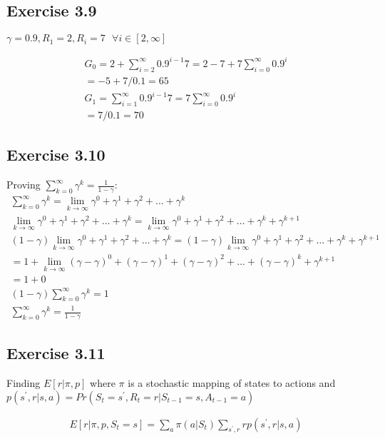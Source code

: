 \subsection{Exercise 3.9}
$\gamma = 0.9, R_1 = 2, R_i = 7 \text{ }\forall i \in [2,\infty]$

\begin{gather}
  G_0 = 2 + \sum_{i=2}^{\infty} 0.9^{i-1}7 = 2 - 7 + 7\sum_{i=0}^{\infty} 0.9^{i} \\
  = -5 + 7/0.1 = 65 \\
  G_1 = \sum_{i=1}^{\infty} 0.9^{i-1}7 = 7\sum_{i=0}^{\infty} 0.9^{i} \\
  = 7/0.1 = 70
\end{gather}

\subsection{Exercise 3.10}
Proving $\sum_{k=0}^{\infty}\gamma^k = \frac{1}{1-\gamma}$: 
\begin{gather}
  \sum_{k=0}^{\infty}\gamma^k = \lim_{k \to \infty}\gamma^0 + \gamma^1 + \gamma^2 + \dots + \gamma^k \\
  \lim_{k \to \infty}\gamma^0 + \gamma^1 + \gamma^2 + \dots + \gamma^k = \lim_{k \to \infty}\gamma^0 + \gamma^1 + \gamma^2 + \dots + \gamma^k + \gamma^{k+1} \\
  (1-\gamma)\lim_{k \to \infty}\gamma^0 + \gamma^1 + \gamma^2 + \dots + \gamma^k = (1-\gamma)\lim_{k \to \infty}\gamma^0 + \gamma^1 + \gamma^2 + \dots + \gamma^k + \gamma^{k+1} \\
  = 1+ \lim_{k \to \infty}(\gamma-\gamma)^0 + (\gamma-\gamma)^1 + (\gamma-\gamma)^2 + \dots + (\gamma-\gamma)^k + \gamma^{k+1} \\
  = 1 + 0 \\
  (1-\gamma)\sum_{k=0}^{\infty}\gamma^k = 1 \\
  \sum_{k=0}^{\infty}\gamma^k = \frac{1}{1-\gamma}
\end{gather}

\subsection{Exercise 3.11}
Finding $E[r|\pi,p]$ where $\pi$ is a stochastic mapping of states to actions and $p(s^\prime,r|s,a) = Pr(S_t = s^\prime, R_t = r  | S_{t-1} = s, A_{t-1} = a )$

\begin{gather}
  E[r|\pi, p, S_t = s] = \sum_a \pi(a|S_t) \sum_{s^\prime, r} r p(s^\prime, r | s,a) 
\end{gather}

